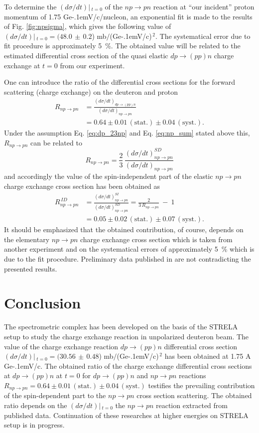\documentclass[twocolumn,epjc3]{svjour3}
\newcommand{\np}     {\ensuremath{np \rightarrow pn}\xspace}
\newcommand{\dpchex} {\ensuremath{dp \rightarrow (pp)n}\xspace}
\newcommand{\GeVc}   {Ge\kern-.1emV/c\xspace}
\begin{document}
To determine the $(d\sigma/dt)|\,_{t=0}$ of the \np reaction at ``our incident''
proton momentum of 1.75 \GeVc/nucleon, an exponential fit is made to the results
of Fig. \ref{fig:npsigma}, which gives the following value of
$(d\sigma/dt)|\,_{t=0} = (48.0\,\pm\,0.2$) mb$/$(\GeVc)$^{\,2}$. The systematical
error due to fit procedure is approximately 5~\%. The obtained value will be
related to the estimated differential cross section of the quasi elastic \dpchex
charge exchange at $t=0$ from our experiment.

One can introduce the ratio of the differential cross sections for the forward
scattering (charge exchange) on the deuteron and proton
\begin{equation}
  \begin{split}
    R_{\np} &= \frac{(d\sigma/dt)_{\dpchex}}{(d\sigma/dt)_{\np}} \\
    &= 0.64 \pm 0.01\,\mathrm{(stat.)} \pm 0.04\,\mathrm{(syst.)}.
  \end{split}
\end{equation}
Under the assumption Eq. \eqref{eq:dp_23np} and Eq. \eqref{eq:np_sum} stated
above this, $R_{\np}$ can be related to
\begin{equation}
  R_{\np} = \frac{2}{3}\,\frac{(d\sigma/dt)^{SD}_{\np}}{(d\sigma/dt)_{\np}}
\end{equation}
and accordingly the value of the spin-independent part of the elastic \np charge
exchange cross section has been obtained as
\begin{equation}
  \begin{split}
    R^{\,ID}_{\np} &= \frac{(d\sigma/dt)^{SI}_{\np}}{(d\sigma/dt)^{SD}_{\np}}
    = \frac{2}{3\,R_{\np}} \ - \ 1 \\
    &= 0.05 \pm 0.02\,\mathrm{(stat.)} \pm 0.07\,\mathrm{(syst.)}.
  \end{split}
\end{equation}
It should be emphasized that the obtained contribution, of course, depends on
the elementary \np charge exchange cross section which is taken from another
experiment and on the systematical errors of approximately 5~\% which is due to
the fit procedure. Preliminary data published in \cite{bas14,bas16} are not
contradicting the presented results.

\section{Conclusion}
The spectrometric complex has been developed on the basis of the STRELA setup to
study the charge exchange reaction in unpolarized deuteron beam. The value of
the charge exchange reaction \dpchex differential cross section
$(d\sigma/dt)|\,_{t=0}=(30.56\,\pm\,0.48$) mb$/$(\GeVc)$^{\,2}$ has been
obtained at 1.75 A \GeVc. The obtained ratio of the charge exchange differential
cross sections at \dpchex at $t=0$ for \dpchex and \np reactions
$R_{\np} = 0.64 \pm 0.01\,\mathrm{(stat.)} \pm 0.04\,\mathrm{(syst.)}$ testifies
the prevailing contribution of the spin-dependent part to the \np cross section
scattering. The obtained ratio depends on the $(d\sigma/dt)|\,_{t=0}$ the \np
reaction extracted from published data. Continuation of these researches at
higher energies on STRELA setup is in progress.
\end{document}

